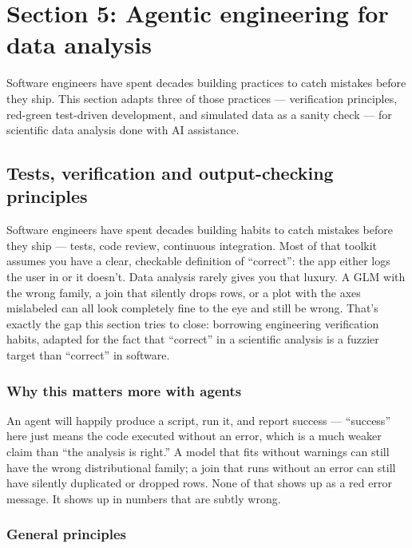 \documentclass[
  letterpaper,
  DIV=11,
  numbers=noendperiod]{scrreprt}
\begin{document}
\part{Section 5: Agentic engineering for data analysis}

Software engineers have spent decades building practices to catch
mistakes before they ship. This section adapts three of those practices
--- verification principles, red-green test-driven development, and
simulated data as a sanity check --- for scientific data analysis done
with AI assistance.

\chapter{Tests, verification and output-checking
principles}\label{tests-verification-and-output-checking-principles}

Software engineers have spent decades building habits to catch mistakes
before they ship --- tests, code review, continuous integration. Most of
that toolkit assumes you have a clear, checkable definition of
``correct'': the app either logs the user in or it doesn't. Data
analysis rarely gives you that luxury. A GLM with the wrong family, a
join that silently drops rows, or a plot with the axes mislabeled can
all look completely fine to the eye and still be wrong. That's exactly
the gap this section tries to close: borrowing engineering verification
habits, adapted for the fact that ``correct'' in a scientific analysis
is a fuzzier target than ``correct'' in software.

\section{Why this matters more with
agents}\label{why-this-matters-more-with-agents}

An agent will happily produce a script, run it, and report success ---
``success'' here just means the code executed without an error, which is
a much weaker claim than ``the analysis is right.'' A model that fits
without warnings can still have the wrong distributional family; a join
that runs without an error can still have silently duplicated or dropped
rows. None of that shows up as a red error message. It shows up in
numbers that are subtly wrong.

\section{General principles}\label{general-principles}
\end{document}
